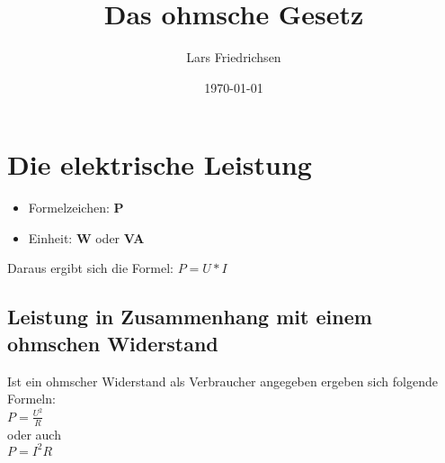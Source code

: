 \documentclass[a4paper,11pt]{scrartcl}	%
\title{Das ohmsche Gesetz}
\author{Lars Friedrichsen}
\date{\today}
\begin{document}
\section{Die elektrische Leistung}

	\begin{itemize}
		\item Formelzeichen: \textbf{P}
		\item Einheit: \textbf{W} oder \textbf{VA}
	\end{itemize}

Daraus ergibt sich die Formel: $P = U * I$

	\subsection{Leistung in Zusammenhang mit einem ohmschen Widerstand}
	
	Ist ein ohmscher Widerstand als Verbraucher angegeben ergeben sich folgende Formeln:\\[0.5cm]
	$P = \frac{U^2}{R}$\\[0.5cm]
	oder auch\\[0.5cm]
	$P = I^2 R$
\end{document}
